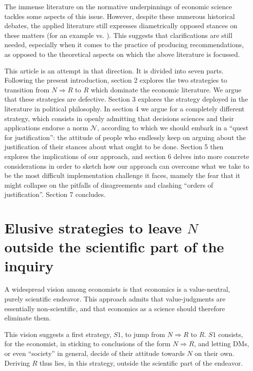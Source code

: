 \documentclass[preprint, french, english, 11pt, authoryear]{elsarticle}%
\newcommand{\adv}{\mathscr{N}}
\begin{document}
The immense literature on the normative underpinnings of economic science \citep{buchanan_positive_1959,sen_nature_1967,dwyer_scientific_1985, heath_value_1994,mongin_value_2006} tackles some aspects of this issue. However, despite these numerous historical debates, the applied literature still expresses diametrically opposed stances on these matters (for an example \citet{spash_bulldozing_2015} vs. \citet{scharks_dont_2016}). This suggests that clarifications are still needed, especially when it comes to the practice of producing recommendations, as opposed to the theoretical aspects on which the above literature is focussed.

This article is an attempt in that direction. It is divided into seven parts. Following the present introduction, section 2 explores the two strategies to transition from $N ⇒ R$ to $R$ which dominate the economic literature. We argue that these strategies are defective. Section 3 explores the strategy deployed in the literature in political philosophy. In section 4 we argue for a completely different strategy, which consists in openly admitting that decisions sciences and their applications endorse a norm $\adv$, according to which we should embark in a ``quest for justification'': the attitude of people who endlessly keep on arguing about the justification of their stances about what ought to be done. Section 5 then explores the implications of our approach, and section 6 delves into more concrete considerations in order to sketch how our approach can overcome what we take to be the most difficult implementation challenge it faces, mamely the fear that it might collapse on the pitfalls of disagreements and clashing ``orders of justification''. Section 7 concludes.

\section{\texorpdfstring{Elusive strategies to leave $N$ outside the scientific part of the inquiry}{Elusive strategies to leave N outside the scientific part of the inquiry}}
A widespread vision among economists is that economics is a value-neutral, purely scientific endeavor. This approach admits that value-judgments are essentially non-scientific, and that economics as a science should therefore eliminate them.

This vision suggests a first strategy, $S1$, to jump from $N ⇒ R$ to $R$. $S1$ consists, for the economist, in sticking to conclusions of the form $N ⇒ R$, and letting \acp{DM}, or even “society” in general, decide of their attitude towards $N$ on their own. Deriving $R$ thus lies, in this strategy, outside the scientific part of the endeavor.
\end{document}
